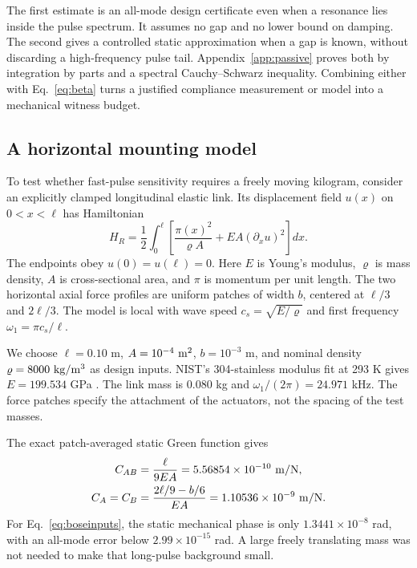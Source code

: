 \documentclass[aps,pra,reprint,amsmath,amssymb,longbibliography,floatfix]{revtex4-2}
\begin{document}
The first estimate is an all-mode design certificate even when a resonance lies inside the pulse spectrum. It assumes no gap and no lower bound on damping. The second gives a controlled static approximation when a gap is known, without discarding a high-frequency pulse tail. Appendix~\ref{app:passive} proves both by integration by parts and a spectral Cauchy--Schwarz inequality. Combining either with Eq.~\eqref{eq:beta} turns a justified compliance measurement or model into a mechanical witness budget.

\subsection{A horizontal mounting model}
To test whether fast-pulse sensitivity requires a freely moving kilogram, consider an explicitly clamped longitudinal elastic link. Its displacement field $u(x)$ on $0<x<\ell$ has Hamiltonian
\begin{equation}
H_R=\frac12\int_0^\ell\left[\frac{\pi(x)^2}{\varrho A}+EA(\partial_xu)^2\right]dx.
\label{eq:rodH}
\end{equation}
The endpoints obey $u(0)=u(\ell)=0$. Here $E$ is Young's modulus, $\varrho$ is mass density, $A$ is cross-sectional area, and $\pi$ is momentum per unit length. The two horizontal axial force profiles are uniform patches of width $b$, centered at $\ell/3$ and $2\ell/3$. The model is local with wave speed $c_s=\sqrt{E/\varrho}$ and first frequency $\omega_1=\pi c_s/\ell$.

We choose $\ell=0.10$ m, $A=10^{-4}\ {\rm m^2}$, $b=10^{-3}$ m, and nominal density $\varrho=8000\ {\rm kg/m^3}$ as design inputs. NIST's 304-stainless modulus fit at 293 K gives $E=199.534$ GPa \cite{NISTsteel}. The link mass is $0.080$ kg and $\omega_1/(2\pi)=24.971$ kHz. The force patches specify the attachment of the actuators, not the spacing of the test masses.

The exact patch-averaged static Green function gives
\begin{equation}
\begin{split}
C_{AB}&=\frac{\ell}{9EA}=5.56854\times10^{-10}\ {\rm m/N},\\
C_A=C_B&=\frac{2\ell/9-b/6}{EA}=1.10536\times10^{-9}\ {\rm m/N}.
\end{split}
\label{eq:rodC}
\end{equation}
For Eq.~\eqref{eq:boseinputs}, the static mechanical phase is only $1.3441\times10^{-8}$ rad, with an all-mode error below $2.99\times10^{-15}$ rad. A large freely translating mass was not needed to make that long-pulse background small.
\end{document}
